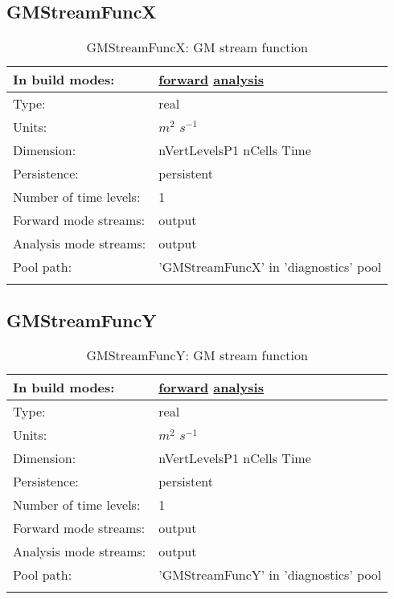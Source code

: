 \subsection[GMStreamFuncX]{GMStreamFuncX}
\label{subsec:var_sec_diagnostics_GMStreamFuncX}
\begin{center}
\begin{longtable}{| p{2.0in} | p{4.0in} |}
        \hline 
        In build modes: & \hyperref[subsec:forward_var_tab_diagnostics]{forward} \hyperref[subsec:analysis_var_tab_diagnostics]{analysis} \\
        \hline 
        Type: & real \\
        \hline 
        Units: & $m^2$ $s^{-1}$ \\
        \hline 
        Dimension: & nVertLevelsP1 nCells Time \\
        \hline 
        Persistence: & persistent \\
        \hline 
        Number of time levels: & 1 \\
        \hline 
		 Forward mode streams: &  output \\
        \hline 
		 Analysis mode streams: &  output \\
        \hline 
            Pool path: & 'GMStreamFuncX' in 'diagnostics' pool
 \\
		 \hline 
    \caption{GMStreamFuncX: GM stream function}
\end{longtable}
\end{center}
\subsection[GMStreamFuncY]{GMStreamFuncY}
\label{subsec:var_sec_diagnostics_GMStreamFuncY}
\begin{center}
\begin{longtable}{| p{2.0in} | p{4.0in} |}
        \hline 
        In build modes: & \hyperref[subsec:forward_var_tab_diagnostics]{forward} \hyperref[subsec:analysis_var_tab_diagnostics]{analysis} \\
        \hline 
        Type: & real \\
        \hline 
        Units: & $m^2$ $s^{-1}$ \\
        \hline 
        Dimension: & nVertLevelsP1 nCells Time \\
        \hline 
        Persistence: & persistent \\
        \hline 
        Number of time levels: & 1 \\
        \hline 
		 Forward mode streams: &  output \\
        \hline 
		 Analysis mode streams: &  output \\
        \hline 
            Pool path: & 'GMStreamFuncY' in 'diagnostics' pool
 \\
		 \hline 
    \caption{GMStreamFuncY: GM stream function}
\end{longtable}
\end{center}
